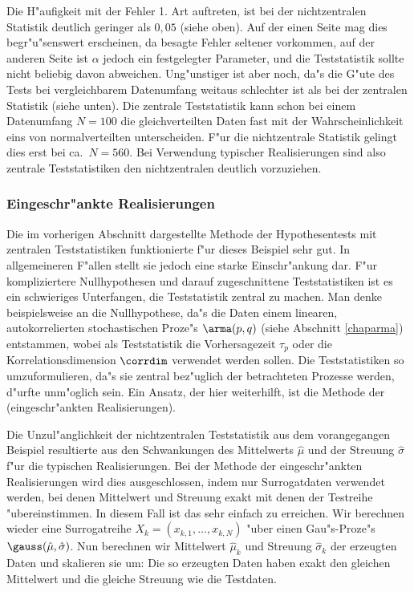  
 Die H"aufigkeit mit der Fehler 1. Art auftreten, ist bei der nichtzentralen Statistik
 deutlich geringer als $0,05$ (siehe  oben). Auf der einen Seite mag
 dies begr"u"senswert erscheinen, da besagte Fehler seltener vorkommen, auf der anderen
 Seite ist $\alpha$ jedoch ein festgelegter Parameter, und die Teststatistik sollte nicht
 beliebig davon abweichen. Ung"unstiger ist aber noch, da"s die G"ute des Tests bei
 vergleichbarem Datenumfang weitaus schlechter ist als bei der zentralen Statistik (siehe
  unten). Die zentrale Teststatistik kann schon bei einem Datenumfang
 $N=100$ die gleichverteilten Daten fast mit der Wahrscheinlichkeit eins von
 normalverteilten unterscheiden. F"ur die nichtzentrale Statistik gelingt dies erst bei
 ca.\ $N=560$. Bei Verwendung typischer Realisierungen sind also zentrale Teststatistiken
 den nichtzentralen deutlich vorzuziehen.


\subsubsection{Eingeschr"ankte Realisierungen}
Die im vorherigen Abschnitt dargestellte Methode der Hypothesentests mit zentralen
Teststatistiken funktionierte f"ur dieses Beispiel sehr gut. In allgemeineren F"allen
stellt sie jedoch eine starke Einschr"ankung dar. F"ur kompliziertere Nullhypothesen und
darauf zugeschnittene Teststatistiken ist es ein schwieriges Unterfangen, die
Teststatistik zentral zu machen.  Man denke beispielsweise an die Nullhypothese, da"s die
Daten einem linearen, autokorrelierten stochastischen Proze"s $\arma(p,q)$ (siehe
Abschnitt \ref{chaparma}) entstammen,
wobei als Teststatistik die Vorhersagezeit $\tau_p$ oder die Korrelationsdimension $\corrdim$
verwendet werden sollen. Die Teststatistiken so umzuformulieren, da"s sie zentral
bez"uglich der betrachteten Prozesse werden, d"urfte unm"oglich sein. Ein Ansatz, der hier
weiterhilft, ist die Methode der \begriff(eingeschr"ankten Realisierungen).

Die Unzul"anglichkeit der nichtzentralen Teststatistik aus dem vorangegangen Beispiel
resultierte aus den Schwankungen des Mittelwerts $\hat\mu$ und der Streuung $\hat\sigma$ 
f"ur die typischen Realisierungen. Bei der Methode der eingeschr"ankten Realisierungen
wird dies ausgeschlossen, indem nur Surrogatdaten verwendet werden, bei denen Mittelwert
und Streuung exakt mit denen der Testreihe "ubereinstimmen. In diesem Fall ist
das sehr einfach zu erreichen. Wir berechnen wieder eine Surrogatreihe
$X_k=(x_{k,1},\dots,x_{k,N})$ "uber einen Gau"s-Proze"s $\gauss(\hat\mu,\hat\sigma)$. Nun
berechnen wir Mittelwert $\hat\mu_k$ und Streuung $\hat\sigma_k$ der erzeugten
Daten und skalieren sie um:
Die so erzeugten Daten haben exakt den gleichen Mittelwert und die gleiche Streuung wie die
Testdaten.

